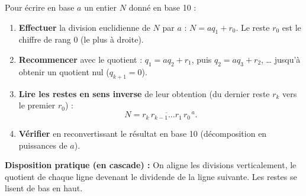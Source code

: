 \documentclass[11pt]{article}
\begin{document}
\begin{methode}
Pour écrire en base $a$ un entier $N$ donné en base 10 :
\begin{enumerate}
\item \textbf{Effectuer} la division euclidienne de $N$ par $a$ : $N = a q_1 + r_0$. Le reste $r_0$ est le chiffre de rang $0$ (le plus à droite).
\item \textbf{Recommencer} avec le quotient : $q_1 = a q_2 + r_1$, puis $q_2 = a q_3 + r_2$, \ldots{} jusqu'à obtenir un quotient nul ($q_{k+1} = 0$).
\item \textbf{Lire les restes en sens inverse} de leur obtention (du dernier reste $r_k$ vers le premier $r_0$) :
\[ N = \overline{r_k \, r_{k-1} \ldots r_1 \, r_0}^{\,a}. \]
\item \textbf{Vérifier} en reconvertissant le résultat en base 10 (décomposition en puissances de $a$).
\end{enumerate}
\textbf{Disposition pratique (en cascade) :} On aligne les divisions verticalement, le quotient de chaque ligne devenant le dividende de la ligne suivante. Les restes se lisent de bas en haut.
\end{methode}
\end{document}
